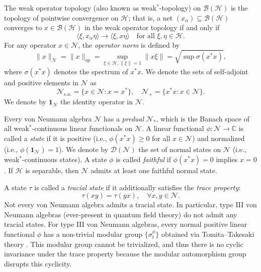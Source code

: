 \documentclass[11pt,reqno]{amsart}
\numberwithin{equation}{section}
\newcommand{\mc}{\mathcal}
\begin{document}
The weak operator topology (also known as weak$^*$-topology) on $\mathcal{B}(\mathcal{H})$ is the topology of pointwise convergence on $\mathcal{H}$; that is, a net $(x_\alpha) \subseteq \mathcal{B}(\mathcal{H})$ converges to $x \in \mathcal{B}(\mathcal{H})$ in the weak operator topology if and only if
$$
\langle \xi, x_\alpha \eta \rangle \to \langle \xi, x \eta \rangle \quad \text{for all } \xi, \eta \in \mathcal{H}.
$$
For any operator $x \in \mathcal{N}$, the \textit{operator norm} is defined by
$$
\|x\|_{\mc N} = \| x \|_{op} = \sup_{\xi \in \mc H, \| \xi \| = 1} \| x \xi \| = \sqrt{ \sup \sigma(x^* x) },
$$
where $\sigma(x^* x)$ denotes the spectrum of $x^* x$. We denote the sets of self-adjoint and positive elements in $\mathcal{N}$ as
$$
\mathcal{N}_{s.a.} = \{ x \in \mathcal{N} : x = x^* \}, \quad \mathcal{N}_{+} = \{ x^*x: x \in \mathcal{N}\}.
$$
We denote by $\mathbf{1}_{\mathcal{N}}$ the identity operator in $\mathcal{N}$.

Every von Neumann algebra $\mathcal{N}$ has a \textit{predual} $\mathcal{N}_*$, which is the Banach space of all weak$^*$-continuous linear functionals on $\mathcal{N}$. A linear functional $\phi : \mathcal{N} \to \mathbb{C}$ is called a \textit{state} if it is positive (i.e., $\phi(x^* x) \geq 0$ for all $x \in \mathcal{N}$) and normalized (i.e., $\phi(\mathbf{1}_{\mathcal{N}}) = 1$). We denote by $\mathcal{D}(\mathcal{N})$ the set of normal states on $\mathcal{N}$ (i.e., weak$^*$-continuous states). A state $\phi$ is called \textit{faithful} if $\phi(x^* x) = 0$ implies $x = 0$. If $\mathcal{H}$ is separable, then $\mathcal{N}$ admits at least one faithful normal state.

A state $\tau$ is called a \textit{tracial state} if it additionally satisfies the \textit{trace property}:
$$
\tau(x y) = \tau(y x), \quad \forall x, y \in \mathcal{N}.
$$
Not every von Neumann algebra admits a tracial state. In particular, type III von Neumann algebras (ever-present in quantum field theory) do not admit any tracial states. For type III von Neumann algebras, every normal positive linear functional $\phi$ has a non-trivial modular group $\{ \sigma_t^\phi \}$ obtained via Tomita–Takesaki theory \cite{sakai2012}. This modular group cannot be trivialized, and thus there is no cyclic invariance under the trace property because the modular automorphism group disrupts this cyclicity.
\end{document}
